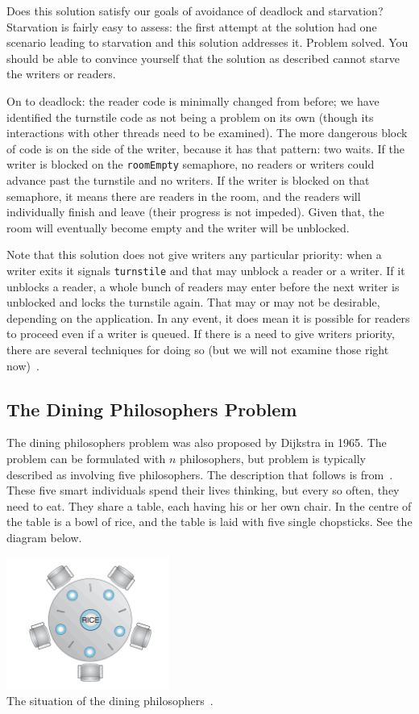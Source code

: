 Does this solution satisfy our goals of avoidance of deadlock and starvation? Starvation is fairly easy to assess: the first attempt at the solution had one scenario leading to starvation and this solution addresses it. Problem solved. You should be able to convince yourself that the solution as described cannot starve the writers or readers.

On to deadlock: the reader code is minimally changed from before; we have identified the turnstile code as not being a problem on its own (though its interactions with other threads need to be examined). The more dangerous block of code is on the side of the writer, because it has that pattern: two waits. If the writer is blocked on the \texttt{roomEmpty} semaphore, no readers or writers could advance past the turnstile and no writers. If the writer is blocked on that semaphore, it means there are readers in the room, and the readers will individually finish and leave (their progress is not impeded). Given that, the room will eventually become empty and the writer will be unblocked.

Note that this solution does not give writers any particular priority: when a writer exits it signals \texttt{turnstile} and that may unblock a reader or a writer. If it unblocks a reader, a whole bunch of readers may enter before the next writer is unblocked and locks the turnstile again. That may or may not be desirable, depending on the application. In any event, it does mean it is possible for readers to proceed even if a writer is queued. If there is a need to give writers priority, there are several techniques for doing so (but we will not examine those right now)~\cite{lbs}.

\subsection*{The Dining Philosophers Problem}

The dining philosophers problem was also proposed by Dijkstra in 1965. The problem can be formulated with $n$ philosophers, but problem is typically described as involving five philosophers. The description that follows is from~\cite{osc}. These five smart individuals spend their lives thinking, but every so often, they need to eat. They share a table, each having his or her own chair. In the centre of the table is a bowl of rice, and the table is laid with five single chopsticks. See the diagram below.

\begin{center}
\includegraphics[width=0.4\textwidth]{images/philosopher-table.png}\\
The situation of the dining philosophers~\cite{osc}.
\end{center}

